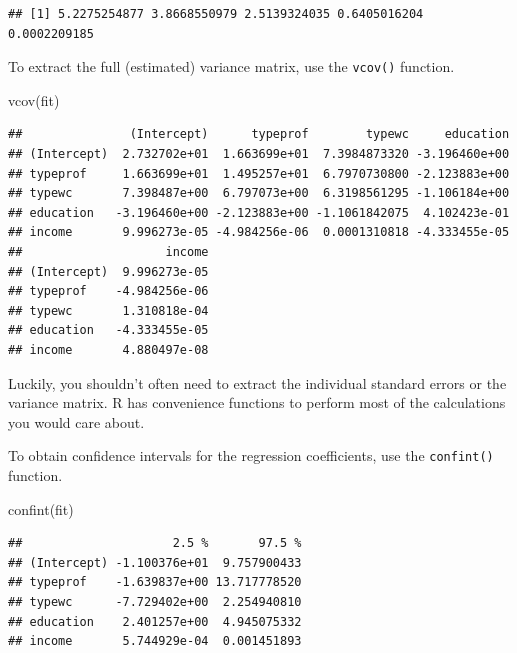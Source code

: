 \documentclass[
  12pt,
  oneside,openany]{book}
\newenvironment{Shaded}{\begin{snugshade}}{\end{snugshade}}
\newcommand{\FunctionTok}[1]{\textcolor[rgb]{0.00,0.00,0.00}{#1}}
\newcommand{\NormalTok}[1]{#1}
\newcommand{\SpecialCharTok}[1]{\textcolor[rgb]{0.00,0.00,0.00}{#1}}
\begin{document}
\begin{Shaded}
\end{Shaded}

\begin{verbatim}
## [1] 5.2275254877 3.8668550979 2.5139324035 0.6405016204 0.0002209185
\end{verbatim}

To extract the full (estimated) variance matrix, use the \texttt{vcov()} function.

\begin{Shaded}
\begin{Highlighting}[]
\FunctionTok{vcov}\NormalTok{(fit)}
\end{Highlighting}
\end{Shaded}

\begin{verbatim}
##               (Intercept)      typeprof        typewc     education
## (Intercept)  2.732702e+01  1.663699e+01  7.3984873320 -3.196460e+00
## typeprof     1.663699e+01  1.495257e+01  6.7970730800 -2.123883e+00
## typewc       7.398487e+00  6.797073e+00  6.3198561295 -1.106184e+00
## education   -3.196460e+00 -2.123883e+00 -1.1061842075  4.102423e-01
## income       9.996273e-05 -4.984256e-06  0.0001310818 -4.333455e-05
##                    income
## (Intercept)  9.996273e-05
## typeprof    -4.984256e-06
## typewc       1.310818e-04
## education   -4.333455e-05
## income       4.880497e-08
\end{verbatim}

Luckily, you shouldn't often need to extract the individual standard errors or the variance matrix. R has convenience functions to perform most of the calculations you would care about.

To obtain confidence intervals for the regression coefficients, use the \texttt{confint()} function.

\begin{Shaded}
\begin{Highlighting}[]
\FunctionTok{confint}\NormalTok{(fit)}
\end{Highlighting}
\end{Shaded}

\begin{verbatim}
##                     2.5 %       97.5 %
## (Intercept) -1.100376e+01  9.757900433
## typeprof    -1.639837e+00 13.717778520
## typewc      -7.729402e+00  2.254940810
## education    2.401257e+00  4.945075332
## income       5.744929e-04  0.001451893
\end{verbatim}
\end{document}
